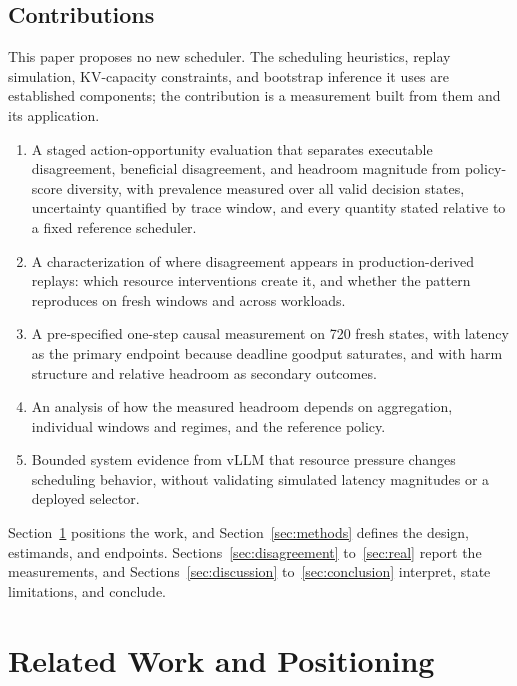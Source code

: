 \documentclass[preprint,12pt]{elsarticle}
\begin{document}
\subsection{Contributions}
This paper proposes no new scheduler. The scheduling heuristics, replay
simulation, KV-capacity constraints, and bootstrap inference it uses are
established components; the contribution is a measurement built from them and
its application.
\begin{enumerate}
  \item A staged action-opportunity evaluation that separates executable
  disagreement, beneficial disagreement, and headroom magnitude from
  policy-score diversity, with prevalence measured over all valid decision
  states, uncertainty quantified by trace window, and every quantity stated
  relative to a fixed reference scheduler.
  \item A characterization of where disagreement appears in production-derived
  replays: which resource interventions create it, and whether the pattern
  reproduces on fresh windows and across workloads.
  \item A pre-specified one-step causal measurement on 720 fresh states, with
  latency as the primary endpoint because deadline goodput saturates, and with
  harm structure and relative headroom as secondary outcomes.
  \item An analysis of how the measured headroom depends on aggregation,
  individual windows and regimes, and the reference policy.
  \item Bounded system evidence from vLLM that resource pressure changes
  scheduling behavior, without validating simulated latency magnitudes or a
  deployed selector.
\end{enumerate}

Section~\ref{sec:related} positions the work, and Section~\ref{sec:methods}
defines the design, estimands, and endpoints. Sections~\ref{sec:disagreement}
to~\ref{sec:real} report the measurements, and Sections~\ref{sec:discussion}
to~\ref{sec:conclusion} interpret, state limitations, and conclude.

\section{Related Work and Positioning}
\label{sec:related}
\end{document}
